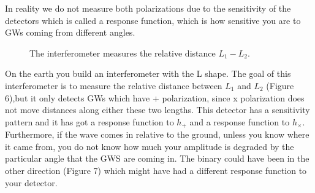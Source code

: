 \documentclass[11pt]{article}
\begin{document}
In reality we do not measure both polarizations due to the sensitivity of the detectors which is called a response function, which is how sensitive you are to GWs coming from different angles.


    \begin{figure} [H]
        \begin{center}






        \caption{ The interferometer measures the relative distance $L_1-L_2$. }
            \end{center}
    \end{figure}

On the earth you build an interferometer with the L shape. The goal of this interferometer is to measure the relative distance between $L_1$ and $L_2$ (Figure 6),but it only detects GWs which have + polarization, since x polarization does not move distances along either these two lengths. This detector has a sensitivity pattern and it has got a response function to $h_+$ and a response function to  $h_\times$.
Furthermore, if the wave comes in relative to the ground, unless you know where it came from, you do not know how much your amplitude  is degraded by the particular angle that the GWS are coming in. The binary could have been in the other direction (Figure 7) which might have had a different response function to your detector.
\end{document}
